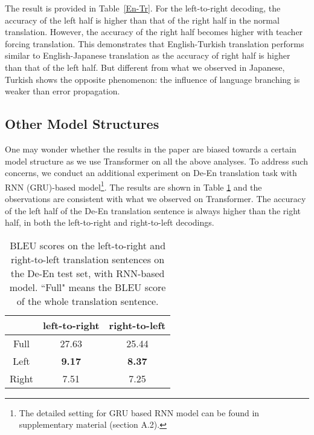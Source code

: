 \documentclass[11pt,a4paper]{article}
\begin{document}
The result is provided in Table~\ref{En-Tr}. For the left-to-right decoding, the accuracy of the left half is higher than that of the right half in the normal translation. However, the accuracy of the right half becomes higher with teacher forcing translation. This demonstrates that English-Turkish translation performs similar to English-Japanese translation as the accuracy of right half is higher than that of the left half. But different from what we observed in Japanese, Turkish shows the opposite phenomenon: the influence of language branching is weaker than error propagation.

\subsection{Other Model Structures}
\label{structure}
One may wonder whether the results in the paper are biased towards a certain model structure as we use Transformer on all the above analyses. To address such concerns, we conduct an additional experiment on De-En translation task with RNN (GRU)-based model\footnote{The detailed setting for GRU based RNN model can be found in supplementary material (section A.2).}. The results are shown in Table \ref{rnn_model} and the observations are consistent with what we observed on Transformer. The accuracy of the left half of the De-En translation sentence is always higher than the right half, in both the left-to-right and right-to-left decodings.

\begin{table}[tbp]
\small
\centering %
\begin{tabular}{ c  c  c  } %
\toprule %
  & \textbf{left-to-right} & \textbf{right-to-left} \\
\midrule
Full & 27.63 & 25.44 \\
\midrule
Left & \textbf{9.17} & \textbf{8.37} \\
Right  & 7.51 & 7.25 \\
\bottomrule
\end{tabular}
\caption{BLEU scores on the left-to-right and right-to-left translation sentences on the De-En test set, with RNN-based model. ``Full" means the BLEU score of the whole translation sentence.}
\label{rnn_model}
\end{table}
\end{document}
